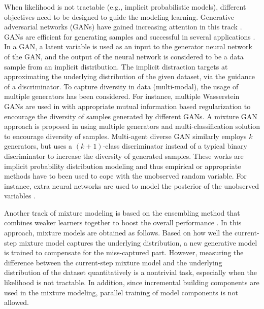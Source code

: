 When likelihood is not tractable (e.g., implicit probabilistic models), different objectives need to be designed to guide the modeling learning. Generative adversarial networks (GANs) have gained increasing attention in this track \cite{NIPS2014_5423, NIPS2016_6125, 2018arXiv180508318Z, salimans2018improving}.
GANs are efficient for generating samples and successful in several applications \cite{ledig2017photo, NIPS2016_6125}. In a GAN, a latent variable is used as
an input to the generator neural network of the GAN, and the output of the neural network is considered to be a data sample from an implicit distribution. The implicit distraction targets at approximating the underlying distribution of the given dataset, via the guidance of a discriminator.
To capture diversity in data (multi-modal), the usage of multiple generators has been considered. For instance, multiple Wasserstein GANs \cite{2017arXiv170107875A} are used in \cite{2018arXiv180600880K} with appropriate mutual information based regularization to encourage the diversity of samples generated by different GANs.
A mixture GAN approach is proposed in \cite{hoang2018mgan} using multiple generators and multi-classification solution to
encourage diversity of samples. Multi-agent diverse GAN \cite{DBLP:journals/corr/GhoshKNTD17} similarly employs $k$ generators, but uses a $(k+1)$-class discriminator instead of a typical binary discriminator to increase the diversity of generated samples. These works are implicit probability distribution modeling and thus empirical or appropriate methods have to been used to cope with the unobserved random variable. For instance, extra neural networks are used to model the posterior of the unobserved variables \cite{donahue2017adversarial, dumoulin2017adversarially}. 


Another track of mixture modeling is based on the ensembling method that combines weaker learners together to boost the overall performance \cite{grover2017aaai_boost,2017arXiv170102386T}. In this approach, mixture models are obtained as follows. Based on how well the current-step mixture model captures the underlying distribution, a new generative model is trained to compensate for the miss-captured part. However, measuring the difference between the current-step mixture model and the underlying distribution of the dataset quantitatively is a nontrivial task, especially when the likelihood is not tractable. In addition, since incremental building components are used in the mixture modeling, parallel training of model components is not allowed.






